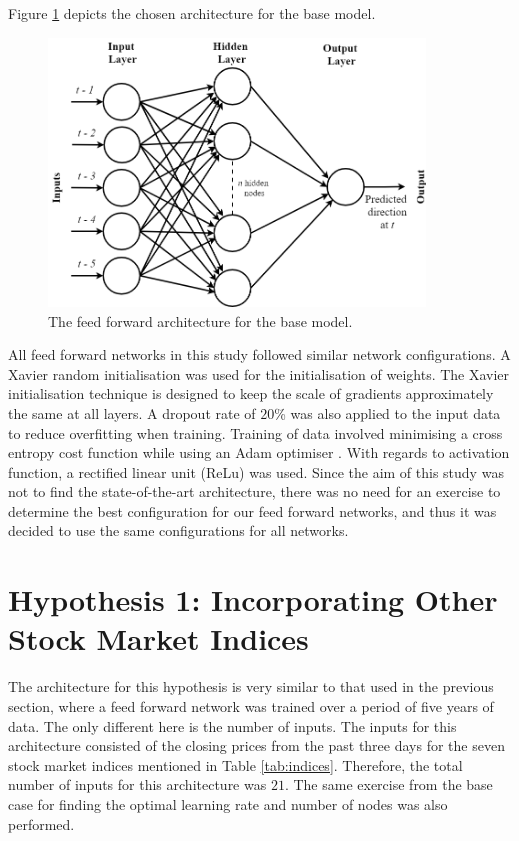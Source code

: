 \documentclass{UoYCSproject}
\begin{document}
Figure \ref{fig:basecase} depicts the chosen architecture for the base model. 

\begin{figure}[h]
\includegraphics[width=10cm]{Base_case_diagram.png}
\centering
\caption{The feed forward architecture for the base model.} 
\label{fig:basecase}
\end{figure}

All feed forward networks in this study followed similar network configurations. A Xavier \cite{glorot2010understanding} random initialisation was used for the initialisation of weights. The Xavier initialisation technique is designed to keep the scale of gradients approximately the same at all layers. A dropout rate of $20$\% was also applied to the input data to reduce overfitting when training. Training of data involved minimising a cross entropy cost function while using an Adam optimiser \cite{kingma2014adam}. With regards to activation function, a rectified linear unit (ReLu) was used. Since the aim of this study was not to find the state-of-the-art architecture, there was no need for an exercise to determine the best configuration for our feed forward networks, and thus it was decided to use the same configurations for all networks. 

\section{Hypothesis 1: Incorporating Other Stock Market Indices}
\label{sec:methodh1}
The architecture for this hypothesis is very similar to that used in the previous section, where a feed forward network was trained over a period of five years of data. The only different here is the number of inputs. The inputs for this architecture consisted of the closing prices from the past three days for the seven stock market indices mentioned in Table \ref{tab:indices}. Therefore, the total number of inputs for this architecture was $21$. The same exercise from the base case for finding the optimal learning rate and number of nodes was also performed. 
\end{document}
